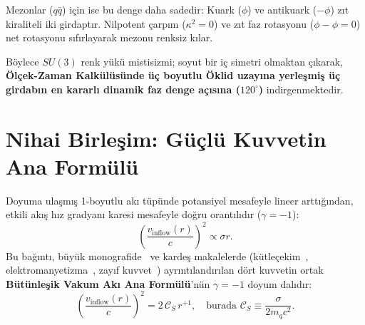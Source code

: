 \documentclass[11pt,a4paper]{article}
\begin{document}
Mezonlar ($q\bar{q}$) için ise bu denge daha sadedir: Kuark ($\phi$) ve antikuark ($-\phi$) zıt kiraliteli iki girdaptır. Nilpotent çarpım ($\kappa^2 = 0$) ve zıt faz rotasyonu ($\phi - \phi = 0$) net rotasyonu sıfırlayarak mezonu renksiz kılar.

Böylece $SU(3)$ renk yükü mistisizmi; soyut bir iç simetri olmaktan çıkarak, \textbf{Ölçek-Zaman Kalkülüsünde üç boyutlu Öklid uzayına yerleşmiş üç girdabın en kararlı dinamik faz denge açısına ($120^\circ$)} indirgenmektedir.

\section{Nihai Birleşim: Güçlü Kuvvetin Ana Formülü}
\label{sec:ana_formul_guclu}

Doyuma ulaşmış 1-boyutlu akı tüpünde potansiyel mesafeyle lineer arttığından, etkili akış hız gradyanı karesi mesafeyle doğru orantılıdır ($\gamma = -1$):
\begin{equation}
    \left( \frac{v_{\mathrm{inflow}}(r)}{c} \right)^2 \propto \sigma r.
    \label{eq:guclu_master_tr}
\end{equation}
Bu bağıntı, büyük monografide~\cite{main_paper} ve kardeş makalelerde (kütleçekim~\cite{paper1}, elektromanyetizma~\cite{paper2}, zayıf kuvvet~\cite{paper4}) ayrıntılandırılan dört kuvvetin ortak \textbf{Bütünleşik Vakum Akı Ana Formülü}'nün $\gamma = -1$ doyum dalıdır:
\begin{equation}
    \boxed{ \left( \frac{v_{\mathrm{inflow}}(r)}{c} \right)^2 = 2 \, \mathcal{C}_S \, r^{+1}, \quad \text{burada } \mathcal{C}_S \equiv \frac{\sigma}{2 m_q c^2}. }
\end{equation}
\end{document}
